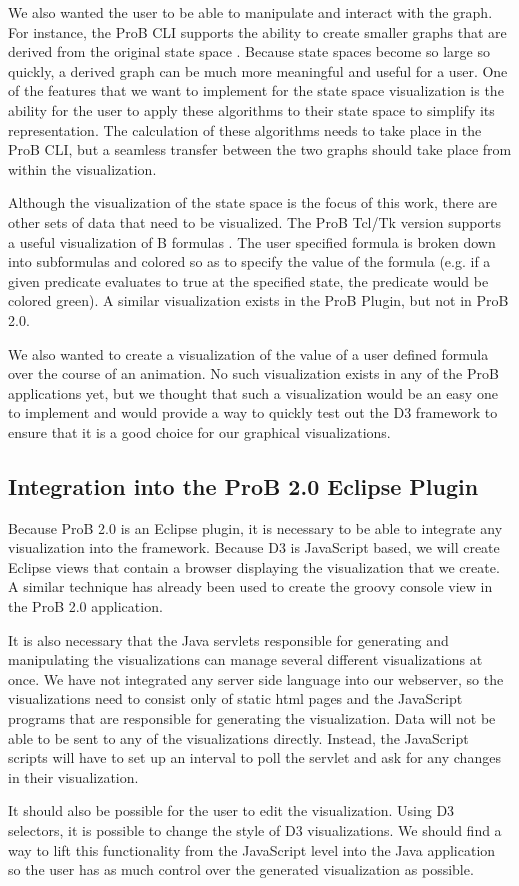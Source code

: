 We also wanted the user to be able to manipulate and interact with the graph. For instance, the ProB CLI supports the ability to create smaller graphs that are derived from the original state space \cite{LeTu05_8}. Because state spaces become so large so quickly, a derived graph can be much more meaningful and useful for a user. One of the features that we want to implement for the state space visualization is the ability for the user to apply these algorithms to their state space to simplify its representation. The calculation of these algorithms needs to take place in the ProB CLI, but a seamless transfer between the two graphs should take place from within the visualization.

Although the visualization of the state space is the focus of this work, there are other sets of data that need to be visualized. The ProB Tcl/Tk version supports a useful visualization of B formulas \cite{LeSaBeLu08_228}. The user specified formula is broken down into subformulas and colored so as to specify the value of the formula (e.g. if a given predicate evaluates to true at the specified state, the predicate would be colored green). A similar visualization exists in the ProB Plugin, but not in ProB 2.0.

We also wanted to create a visualization of the value of a user defined formula over the course of an animation. No such visualization exists in any of the ProB applications yet, but we thought that such a visualization would be an easy one to implement and would provide a way to quickly test out the D3 framework to ensure that it is a good choice for our graphical visualizations.

\subsection{Integration into the ProB 2.0 Eclipse Plugin}

Because ProB 2.0 is an Eclipse plugin, it is necessary to be able to integrate any visualization into the framework. Because D3 is JavaScript based, we will create Eclipse views that contain a browser displaying the visualization that we create. A similar technique has already been used to create the groovy console view in the ProB 2.0 application.

It is also necessary that the Java servlets responsible for generating and manipulating the visualizations can manage several different visualizations at once. We have not integrated any server side language into our webserver, so the visualizations need to consist only of static html pages and the JavaScript programs that are responsible for generating the visualization. Data will not be able to be sent to any of the visualizations directly. Instead, the JavaScript scripts will have to set up an interval to poll the servlet and ask for any changes in their visualization.

It should also be possible for the user to edit the visualization. Using D3 selectors, it is possible to change the style of D3 visualizations. We should find a way to lift this functionality from the JavaScript level into the Java application so the user has as much control over the generated visualization as possible.